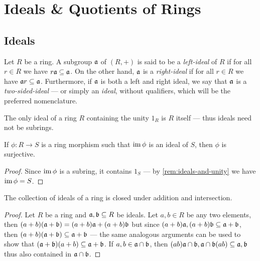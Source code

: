 \section{Ideals \& Quotients of Rings}

\subsection{Ideals}

\begin{definition}[Ideal]
    \label{def:ring-ideal}
    Let \(R\) be a ring. A subgroup \(\mathfrak{a}\) of \((R, +)\) is said to be a
    \emph{left-ideal} of \(R\) if for all \(r \in R\) we have
    \(r \mathfrak{a} \subseteq \mathfrak{a}\). On the other hand, \(\mathfrak{a}\) is a
    \emph{right-ideal} if for all \(r \in R\) we have
    \(\mathfrak{a} r \subseteq \mathfrak{a}\). Furthermore, if \(\mathfrak{a}\) is both a
    left and right ideal, we say that \(\mathfrak{a}\) is a \emph{two-sided-ideal} ---
    or simply an \emph{ideal}, without qualifiers, which will be the preferred
    nomenclature.
\end{definition}

\begin{remark}
    \label{rem:ideals-and-unity}
    The only ideal of a ring \(R\) containing the unity \(1_R\) is \(R\) itself ---
    thus ideals need not be subrings.
\end{remark}

\begin{corollary}
    \label{cor:image-is-ideal-then-surjective}
    If \(\phi: R \to S\) is a ring morphism such that \(\operatorname{im} \phi\) is an ideal of
    \(S\), then \(\phi\) is surjective.
\end{corollary}

\begin{proof}
    Since \(\operatorname{im} \phi\) is a subring, it contains \(1_S\) --- by
    \cref{rem:ideals-and-unity} we have \(\operatorname{im} \phi = S\).
\end{proof}

\begin{corollary}
    \label{cor:ideals-addition-intersection}
    The collection of ideals of a ring is closed under addition and intersection.
\end{corollary}

\begin{proof}
    Let \(R\) be a ring and \(\mathfrak{a}, \mathfrak{b} \subseteq R\) be ideals. Let
    \(a, b \in R\) be any two elements, then
    \((a + b)(\mathfrak{a} + \mathfrak{b}) = (a + b) \mathfrak{a} + (a + b) \mathfrak{b}\) but
    since \((a + b) \mathfrak{a}, (a + b) \mathfrak{b} \subseteq \mathfrak{a} + \mathfrak{b}\),
    then \((a + b) (\mathfrak{a} + \mathfrak{b}) \subseteq \mathfrak{a} + \mathfrak{b}\) --- the
    same analogous arguments can be used to show that
    \((\mathfrak{a} + \mathfrak{b})(a + b) \subseteq \mathfrak{a} + \mathfrak{b}\). If
    \(a, b \in \mathfrak{a} \cap \mathfrak{b}\), then
    \((ab) \mathfrak{a} \cap \mathfrak{b}, \mathfrak{a} \cap \mathfrak{b} (a b) \subseteq
    \mathfrak{a}, \mathfrak{b}\) thus also contained in \(\mathfrak{a} \cap \mathfrak{b}\).
\end{proof}

